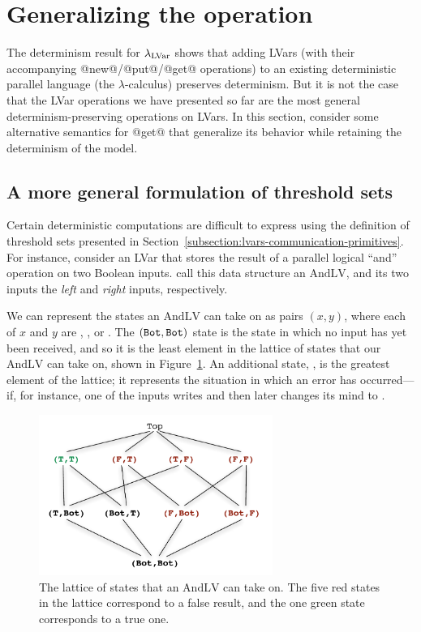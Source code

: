 \section{Generalizing the  operation}\label{s:lvars-generalizing}

The determinism result for $\lambda_{\textrm{LVar}}$ shows that adding LVars (with
their accompanying @new@/@put@/@get@ operations) to an existing
deterministic parallel language (the $\lambda$-calculus) preserves
determinism.  But it is not the case that the LVar operations we have
presented so far are the most general determinism-preserving
operations on LVars.  In this section,  consider some
alternative semantics for @get@ that generalize its behavior while
retaining the determinism of the model.

\subsection{A more general formulation of threshold sets}\label{subsection:lvars-a-more-general-formulation-of-threshold-sets}

Certain deterministic computations are difficult to express using the
definition of threshold sets presented in
Section~\ref{subsection:lvars-communication-primitives}.  For
instance, consider an LVar that stores the result of a parallel
logical ``and'' operation on two Boolean inputs.   call this data
structure an $\mathrm{AndLV}$, and its two inputs the \emph{left} and
\emph{right} inputs, respectively.

We can represent the states an $\mathrm{AndLV}$ can take on as pairs
$(x, y)$, where each of $x$ and $y$ are , , or .
The $(\texttt{Bot},\texttt{Bot})$ state is the state in which no input has yet
been received, and so it is the least element in the lattice of states
that our $\mathrm{AndLV}$ can take on, shown in
Figure~\ref{f:lvars-parallel-and}.  An additional state, , is
the greatest element of the lattice; it represents the situation in
which an error has occurred---if, for instance, one of the inputs
writes  and then later changes its mind to .

\begin{figure}
\begin{center}
  \includegraphics[width=3in]{chapter2/figures/lvars-parallel-and.pdf}
\end{center}
  \caption{The lattice of states that an $\mathrm{AndLV}$ can take on.
    The five red states in the lattice correspond to a false result,
    and the one green state corresponds to a true one.}
  \label{f:lvars-parallel-and}
\end{figure}

